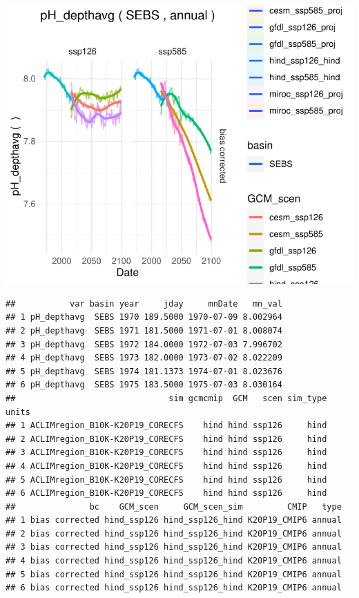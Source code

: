\documentclass[
]{article}
\newenvironment{Shaded}{\begin{snugshade}}{\end{snugshade}}
\newcommand{\FunctionTok}[1]{\textcolor[rgb]{0.00,0.00,0.00}{#1}}
\newcommand{\NormalTok}[1]{#1}
\newcommand{\SpecialCharTok}[1]{\textcolor[rgb]{0.00,0.00,0.00}{#1}}
\begin{document}
\begin{center}\includegraphics{ACLIM2_quickStart_files/figure-latex/unnamed-chunk-7-1} \end{center}

\begin{Shaded}
\end{Shaded}

\begin{verbatim}
##           var basin year     jday     mnDate   mn_val
## 1 pH_depthavg  SEBS 1970 189.5000 1970-07-09 8.002964
## 2 pH_depthavg  SEBS 1971 181.5000 1971-07-01 8.008074
## 3 pH_depthavg  SEBS 1972 184.0000 1972-07-03 7.996702
## 4 pH_depthavg  SEBS 1973 182.0000 1973-07-02 8.022209
## 5 pH_depthavg  SEBS 1974 181.1373 1974-07-01 8.023676
## 6 pH_depthavg  SEBS 1975 183.5000 1975-07-03 8.030164
##                               sim gcmcmip  GCM   scen sim_type units
## 1 ACLIMregion_B10K-K20P19_CORECFS    hind hind ssp126     hind      
## 2 ACLIMregion_B10K-K20P19_CORECFS    hind hind ssp126     hind      
## 3 ACLIMregion_B10K-K20P19_CORECFS    hind hind ssp126     hind      
## 4 ACLIMregion_B10K-K20P19_CORECFS    hind hind ssp126     hind      
## 5 ACLIMregion_B10K-K20P19_CORECFS    hind hind ssp126     hind      
## 6 ACLIMregion_B10K-K20P19_CORECFS    hind hind ssp126     hind      
##               bc    GCM_scen     GCM_scen_sim         CMIP   type
## 1 bias corrected hind_ssp126 hind_ssp126_hind K20P19_CMIP6 annual
## 2 bias corrected hind_ssp126 hind_ssp126_hind K20P19_CMIP6 annual
## 3 bias corrected hind_ssp126 hind_ssp126_hind K20P19_CMIP6 annual
## 4 bias corrected hind_ssp126 hind_ssp126_hind K20P19_CMIP6 annual
## 5 bias corrected hind_ssp126 hind_ssp126_hind K20P19_CMIP6 annual
## 6 bias corrected hind_ssp126 hind_ssp126_hind K20P19_CMIP6 annual
\end{verbatim}
\end{document}
